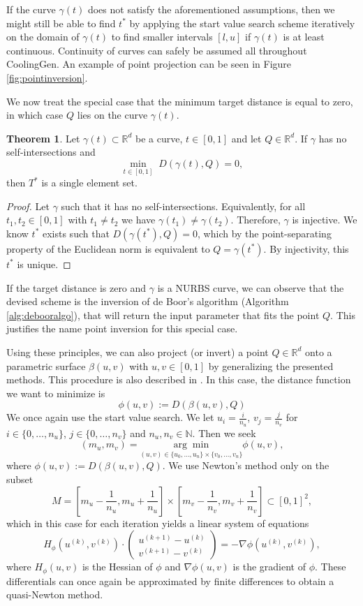 \documentclass[a4paper, 11pt]{report}
\theoremstyle{definition}
\newtheorem{theorem}[definition]{Theorem}
\begin{document}
	If the curve $\gamma(t)$ does not satisfy the aforementioned assumptions, then we might still be able to find $t^*$ by applying the start value search scheme iteratively on the domain of $\gamma(t)$ to find smaller intervals $[l,u]$ if $\gamma(t)$ is at least continuous. Continuity of curves can safely be assumed all throughout CoolingGen. An example of point projection can be seen in Figure \ref{fig:pointinversion}.

	We now treat the special case that the minimum target distance is equal to zero, in which case $Q$ lies on the curve $\gamma(t)$.
	\begin{theorem}
		Let $\gamma(t) \subset \mathbb{R}^d$ be a curve, $t \in [0,1]$ and let $Q \in \mathbb{R}^d$. If $\gamma$ has no self-intersections and
			$$\underset{t\in[0,1]}{\min} \; D(\gamma(t), Q) = 0,$$
		then $T^*$ is a single element set.
	\end{theorem}
	\begin{proof}
		Let $\gamma$ such that it has no self-intersections. Equivalently, for all $t_1, t_2 \in [0,1]$ with $t_1 \neq t_2$ we have $\gamma(t_1) \neq \gamma(t_2)$. Therefore, $\gamma$ is injective. We know $t^*$ exists such that $D(\gamma(t^*), Q) = 0$, which by the point-separating property of the Euclidean norm is equivalent to $Q = \gamma(t^*)$. By injectivity, this $t^*$ is unique.
	\end{proof}

	If the target distance is zero and $\gamma$ is a NURBS curve, we can observe that the devised scheme is the inversion of de Boor's algorithm (Algorithm \ref{alg:debooralgo}), that will return the input parameter that fits the point $Q$. This justifies the name point inversion for this special case.

	Using these principles, we can also project (or invert) a point $Q \in \mathbb{R}^d$ onto a parametric surface $\beta(u,v)$ with $u,v \in [0,1]$ by generalizing the presented methods. This procedure is also described in \cite{Piegl1997}.
	In this case, the distance function we want to minimize is 
		$$ \phi(u,v) := D(\beta(u,v), Q)$$
	We once again use the start value search. We let $u_i = \frac{i}{n_u}$, $v_j = \frac{j}{n_v}$ for $i \in \{0, \ldots, n_u\}$, $j \in \{0,\ldots, n_v\}$ and $n_u, n_v \in \mathbb{N}$. Then we seek
		$$ (m_u, m_v) = \underset{(u,v)\in\{u_0, \ldots, u_n\} \times \{v_0, \ldots, v_n\}}{\arg\min} \phi(u,v), $$
	where $\phi(u,v) := D(\beta(u,v), Q)$. We use Newton's method only on the subset
		$$  M = [m_u - \frac{1}{n_u}, m_u + \frac{1}{n_u}] \times [m_v - \frac{1}{n_v}, m_v + \frac{1}{n_v}] \subset [0,1]^2, $$
	which in this case for each iteration yields a linear system of equations
		$$ 	
			H_\phi
			\left(
					u^{(k)},
					v^{(k)}
			\right)
			\cdot
			\begin{pmatrix}
				u^{(k+1)} - u^{(k)} \\
				v^{(k+1)} - v^{(k)} 
			\end{pmatrix} 
			=
			-\nabla \phi
			\left(
					u^{(k)},
					v^{(k)}
			\right),
		$$
	where $H_\phi(u,v)$ is the Hessian of $\phi$ and $\nabla \phi(u,v)$ is the gradient of $\phi$. These differentials can once again be approximated by finite differences to obtain a quasi-Newton method.
\end{document}
